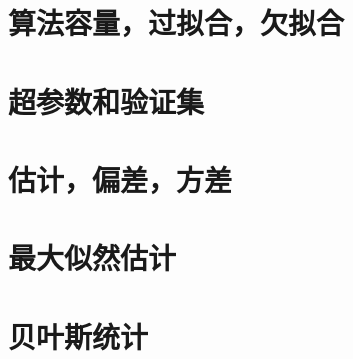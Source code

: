\section{算法容量，过拟合，欠拟合}
\label{sec:5.2}

\section{超参数和验证集}
\label{sec:5.3}

\section{估计，偏差，方差}
\label{sec:5.4}

\section{最大似然估计}
\label{sec:5.5}

\section{贝叶斯统计}
\label{sec:5.6}